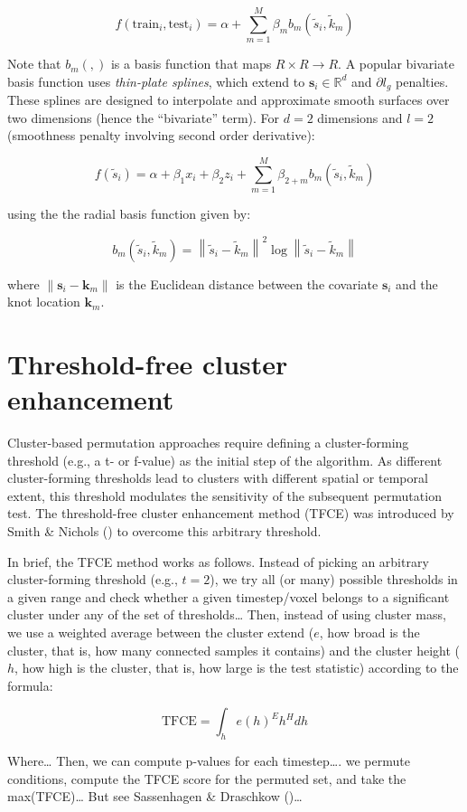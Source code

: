 \documentclass[
  doc,
  floatsintext,
  longtable,
  a4paper,
  nolmodern,
  notxfonts,
  notimes,
  colorlinks=true,linkcolor=blue,citecolor=blue,urlcolor=blue]{apa7}
\begin{document}
\[
f \left(\text{train}_{i}, \text{test}_{i} \right) = \alpha + \sum_{m=1}^M \beta_{m} b_{m} \left(\tilde{s}_{i}, \tilde{k}_{m} \right)
\]

Note that \(b_{m}(,)\) is a basis function that maps
\(R \times R \rightarrow R\). A popular bivariate basis function uses
\emph{thin-plate splines}, which extend to
\(\mathbf{s}_{i} \in \mathbb{R}^{d}\) and \(\partial l_{g}\) penalties.
These splines are designed to interpolate and approximate smooth
surfaces over two dimensions (hence the ``bivariate'' term). For \(d=2\)
dimensions and \(l=2\) (smoothness penalty involving second order
derivative):

\[
f \left(\tilde{s}_{i} \right) = \alpha + \beta_{1} x_{i} + \beta_{2} z_{i} +\sum_{m=1}^{M} \beta_{2+m} b_m\left(\tilde{s}_i, \tilde{k}_m\right)
\]

using the the radial basis function given by:

\[
b_m\left(\tilde{s}_i, \tilde{k}_m\right)=\left\|\tilde{s}_i-\tilde{k}_m\right\|^2 \log \left\|\tilde{s}_i-\tilde{k}_m\right\|
\]

where \(\left\|\mathbf{s}_i-\mathbf{k}_{m}\right\|\) is the Euclidean
distance between the covariate \(\mathbf{s}_{i}\) and the knot location
\(\mathbf{k}_{m}\).

\newpage

\section{Threshold-free cluster
enhancement}\label{threshold-free-cluster-enhancement}

Cluster-based permutation approaches require defining a cluster-forming
threshold (e.g., a t- or f-value) as the initial step of the algorithm.
As different cluster-forming thresholds lead to clusters with different
spatial or temporal extent, this threshold modulates the sensitivity of
the subsequent permutation test. The threshold-free cluster enhancement
method (TFCE) was introduced by Smith \& Nichols
() to overcome this arbitrary threshold.

In brief, the TFCE method works as follows. Instead of picking an
arbitrary cluster-forming threshold (e.g., \(t=2\)), we try all (or
many) possible thresholds in a given range and check whether a given
timestep/voxel belongs to a significant cluster under any of the set of
thresholds\ldots{} Then, instead of using cluster mass, we use a
weighted average between the cluster extend (\(e\), how broad is the
cluster, that is, how many connected samples it contains) and the
cluster height (\(h\), how high is the cluster, that is, how large is
the test statistic) according to the formula:

\[
\text{TFCE} = \int_{h} e(h)^{E} h^{H} dh
\]

Where\ldots{} Then, we can compute p-values for each timestep\ldots. we
permute conditions, compute the TFCE score for the permuted set, and
take the max(TFCE)\ldots{} But see Sassenhagen \& Draschkow
()\ldots{}
\end{document}
